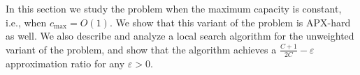In this section we study the \carpool problem when the maximum
capacity is constant, i.e., when $c_{\max} = O(1)$.  We show that this
variant of the problem is APX-hard as well.  We also describe and
analyze a local search algorithm for the unweighted variant of the
problem, and show that the algorithm achieves a $\frac{C + 1}{2C}
- \varepsilon$ approximation ratio for any $\varepsilon > 0$.


